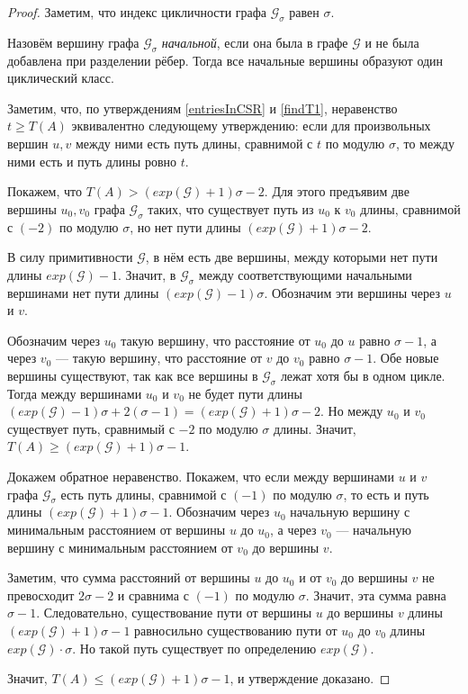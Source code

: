 \documentclass[12pt]{article}
\theoremstyle{definition}
\begin{document}
\begin{proof}
Заметим, что индекс цикличности графа $\mathcal{G}_\sigma$ равен $\sigma$.

Назовём вершину графа $\mathcal{G}_\sigma$ \textit{начальной}, если она была в графе $\mathcal{G}$ и не была добавлена при разделении рёбер. Тогда все начальные вершины образуют один циклический класс.

Заметим, что, по утверждениям \ref{entriesInCSR} и \ref{findT1}, неравенство $t \ge T(A)$ эквивалентно следующему утверждению: если для произвольных вершин $u, v$ между ними есть путь длины,  сравнимой с $t$ по модулю $\sigma$, то между ними есть и путь длины ровно $t$.

Покажем, что $T(A) > (exp(\mathcal{G}) + 1)\sigma - 2$. Для этого предъявим две вершины $u_0, v_0$ графа $\mathcal{G}_\sigma$ таких, что существует путь из $u_0$ к $v_0$ длины, сравнимой с $(-2)$ по модулю $\sigma$, но нет пути длины $(exp(\mathcal{G}) + 1)\sigma - 2$.

В силу примитивности $\mathcal{G}$, в нём есть две вершины, между которыми нет пути длины $exp(\mathcal{G}) - 1$. Значит, в $\mathcal{G}_\sigma$ между соответствующими начальными вершинами нет пути длины $(exp(\mathcal{G}) - 1)\sigma$. Обозначим эти вершины через $u$ и $v$.

Обозначим через $u_0$ такую вершину, что расстояние от $u_0$ до $u$ равно $\sigma - 1$, а через $v_0$ --- такую вершину, что расстояние от $v$ до $v_0$ равно $\sigma - 1$. Обе новые вершины существуют, так как все вершины в $\mathcal{G}_{\sigma}$ лежат хотя бы в одном цикле. Тогда между вершинами $u_0$ и $v_0$ не будет пути длины $(exp(\mathcal{G})- 1)\sigma + 2(\sigma - 1) = (exp(\mathcal{G}) + 1)\sigma - 2$. Но между $u_0$ и $v_0$ существует путь, сравнимый с $-2$ по модулю $\sigma$ длины. Значит, $T(A) \ge (exp(\mathcal{G}) + 1)\sigma - 1$.

Докажем обратное неравенство. Покажем, что если между вершинами $u$ и $v$ графа $\mathcal{G}_\sigma$ есть путь длины, сравнимой с $(-1)$ по модулю $\sigma$, то есть и путь длины $(exp(\mathcal{G}) + 1)\sigma - 1$. Обозначим через $u_0$ начальную вершину с минимальным расстоянием от вершины $u$ до $u_0$, а через $v_0$ --- начальную вершину с минимальным расстоянием от $v_0$ до вершины $v$.

Заметим, что сумма расстояний от вершины $u$ до $u_0$ и от $v_0$ до вершины $v$ не превосходит $2\sigma - 2$ и сравнима с $(-1)$ по модулю $\sigma$. Значит, эта сумма равна $\sigma - 1$. Следовательно, существование пути от вершины $u$ до вершины $v$ длины $(exp(\mathcal{G}) + 1)\sigma - 1$ равносильно существованию пути от $u_0$ до $v_0$ длины $exp(\mathcal{G}) \cdot \sigma$. Но такой путь существует по определению $exp(\mathcal{G})$.

Значит, $T(A) \le (exp(\mathcal{G}) + 1)\sigma - 1$, и утверждение доказано.
\end{proof}
\end{document}
